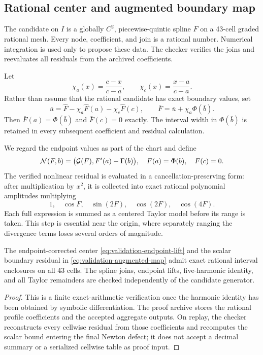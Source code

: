 \subsection{Rational center and augmented boundary map}

The candidate on $I$ is a globally $C^2$, piecewise-quintic spline $\widehat F$
on a 43-cell graded rational mesh.  Every node, coefficient, and join is a
rational number.  Numerical integration is used only to propose these data.
The checker verifies the joins and reevaluates all residuals from the archived
coefficients.

Let
\[
 \chi_a(x)=\frac{c-x}{c-a},\qquad
 \chi_c(x)=\frac{x-a}{c-a}.
\]
Rather than assume that the rational candidate has exact boundary values, set
\begin{equation}
 \bar u=\widehat F-\chi_a\widehat F(a)-\chi_c\widehat F(c),
 \qquad
 \bar F=\bar u+\chi_a\Phi(\bar b).
 \label{eq:validation-endpoint-lift}
\end{equation}
Then $\bar F(a)=\Phi(\bar b)$ and $\bar F(c)=0$ exactly.  The interval width in
$\Phi(\bar b)$ is retained in every subsequent coefficient and residual
calculation.

We regard the endpoint values as part of the chart and define
\begin{equation}
 \mathcal N(F,b)=\bigl(\mathcal G(F),F'(a)-\Gamma(b)\bigr),
 \quad F(a)=\Phi(b),\quad F(c)=0.
 \label{eq:validation-augmented-map}
\end{equation}
The verified nonlinear residual is evaluated in a cancellation-preserving
form: after multiplication by $x^2$, it is collected into exact rational
polynomial amplitudes multiplying
\[
 1,\quad \cos F,\quad \sin(2F),\quad \cos(2F),\quad \cos(4F).
\]
Each full expression is summed as a centered Taylor model before its range is
taken.  This step is essential near the origin, where separately ranging the
divergence terms loses several orders of magnitude.

\begin{lemma}
\label{lem:validation-center-residual}
The endpoint-corrected center \eqref{eq:validation-endpoint-lift} and the
scalar boundary residual in \eqref{eq:validation-augmented-map} admit exact
rational interval enclosures on all 43 cells.  The spline joins, endpoint
lifts, five-harmonic identity, and all Taylor remainders are checked
independently of the candidate generator.
\end{lemma}

\begin{proof}
This is a finite exact-arithmetic verification once the harmonic identity has
been obtained by symbolic differentiation.  The proof archive stores the
rational profile coefficients and the accepted aggregate outputs.  On replay,
the checker reconstructs every cellwise residual from those coefficients and
recomputes the scalar bound entering the final Newton defect; it does not
accept a decimal summary or a serialized cellwise table as proof input.
\end{proof}

